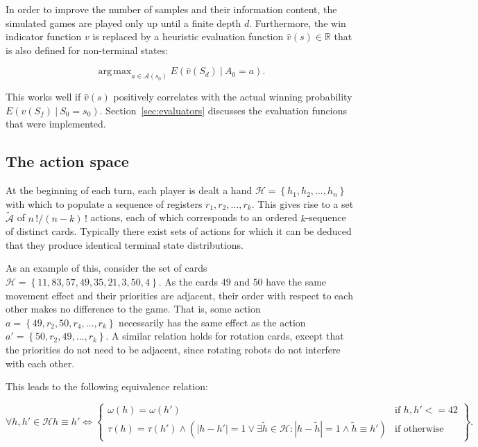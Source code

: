 \documentclass{article}
\newcommand{\twopartdef}[4]
{
	\left\{
		\begin{array}{ll}
			#1 & \mbox{if } #2 \\
			#3 & \mbox{if } #4
		\end{array}
	\right\}.
}
\newcommand{\reals}{\mathbb{R}}
\newcommand{\Action}{A}
\newcommand{\action}{a}
\newcommand{\actions}{\mathcal{A}}
\newcommand{\randomState}{S}
\newcommand{\state}{s}
\newcommand{\hand}{\mathcal{H}}
\newcommand{\depth}{d}
\newcommand{\evaluator}{v}
\newcommand{\expectation}[2]{E\left({#1\given#2}\right)}
\newcommand{\given}[1][]{\:#1\vert\:}
\newcommand{\factorial}[1]{#1\,!}
\newcommand{\abs}[1]{\left|#1\right|}
\DeclareMathOperator*{\argmax}{arg\,max}
\newcommand{\initial}{0}
\newcommand{\final}{f}
\newcommand{\rotation}[1]{\omega(#1)}
\newcommand{\translation}[1]{\tau(#1)}
\begin{document}
In order to improve the number of samples and their information content, the simulated games are played only up until a finite depth $\depth$.  Furthermore, the win indicator function $\evaluator$ is replaced by a heuristic evaluation function $\hat{\evaluator}\left(\state\right) \in \reals$ that is also defined for non-terminal states:

\[
\argmax_{\action \in \actions\left(\state_\initial\right)} \expectation{\hat{\evaluator}\left(\randomState_\depth\right)}{\Action_\initial=\action}.
\]

This works well if $\hat{\evaluator}\left(\state\right)$ positively correlates with the actual winning probability $\expectation{\evaluator\left(\randomState_\final\right)}{\randomState_\initial = \state_\initial}$.  Section~\ref{sec:evaluators} discusses the evaluation funcions that were implemented.

\subsection{The action space}

At the beginning of each turn, each player is dealt a hand $\hand = \left\{h_1,h_2,\ldots,h_n\right\}$ with which to populate a sequence of registers $r_1,r_2,\ldots,r_k$.  This gives rise to a set $\tilde{\actions}$ of $\factorial{n}/\factorial{\left(n-k\right)}$ actions, each of which corresponds to an ordered $k$-sequence of distinct cards.  Typically there exist sets of actions for which it can be deduced that they produce identical terminal state distributions.

As an example of this, consider the set of cards $\hand = \left\{11,83,57,49,35,21, 3,50, 4\right\}$.  As the cards $49$ and $50$ have the same movement effect and their priorities are adjacent, their order with respect to each other makes no difference to the game.  That is, some action $\action = \left\{49,r_2,50,r_4,\ldots,r_k\right\}$ necessarily has the same effect as the action $\action' = \left\{50,r_2,49,\ldots,r_k\right\}$.  A similar relation holds for rotation cards, except that the priorities do not need to be adjacent, since rotating robots do not interfere with each other.

This leads to the following equivalence relation:

\[
\forall h, h' \in \hand
h \equiv h' \iff
\twopartdef{\rotation{h} = \rotation{h'}}{h,h' <= 42}
           {\translation{h} = \translation{h'} \land
           \left(
           \abs{h - h'} = 1 \lor
           \exists \tilde{h} \in \hand \colon
                   \abs{h - \tilde{h}} = 1 \land
                   \tilde{h} \equiv h'
           \right)
           }{\text{otherwise}}
\]
\end{document}
